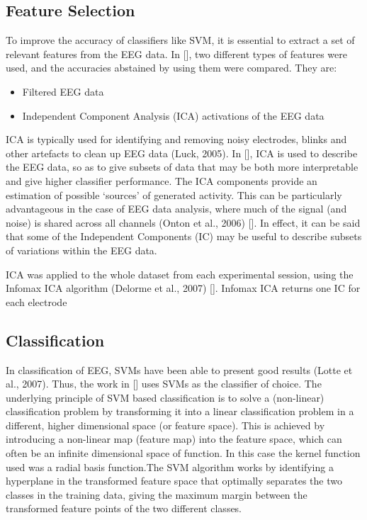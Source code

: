 \documentclass{article} %
\begin{document}
\subsection{Feature Selection}
To improve the accuracy of classifiers like SVM, it is essential to extract a set of relevant features from the EEG data. In [], two different types of features were used, and the accuracies abstained by using them were compared. They are:

\begin{itemize}
	\item Filtered EEG data
	\item Independent Component Analysis (ICA) activations of the EEG data
\end{itemize}

ICA is typically used for identifying and removing noisy electrodes, blinks and other artefacts to clean up EEG data (Luck, 2005). In [], ICA is used to describe the EEG data, so as to give subsets of data that may be both more interpretable and give higher classifier performance. The ICA components provide an estimation of possible ‘sources’ of generated activity. This can be particularly advantageous in the case of EEG data analysis, where much of the signal (and noise) is shared across all channels (Onton et al., 2006) []. In effect, it can be said that some of the Independent Components (IC) may be useful to describe subsets of variations within the EEG data. 

ICA was applied to the whole dataset from each experimental session, using the Infomax ICA algorithm (Delorme et al., 2007) []. Infomax ICA returns one IC for each electrode

\subsection{Classification}
In classification of EEG, SVMs have been able to present good results (Lotte et al., 2007). Thus, the work in [] uses SVMs as the classifier of choice. The underlying principle of SVM based classification is to solve
a (non-linear) classification problem by transforming it into a linear classification problem in a different, higher dimensional space (or feature space). This is achieved by introducing a non-linear map (feature map)
into the feature space, which can often be an infinite dimensional space of function. In this case the kernel function used  was a radial basis function.The SVM algorithm works by identifying a hyperplane in the transformed feature space that optimally separates the two classes in the training data, giving the maximum margin between the transformed feature points of the two different classes.
\end{document}
